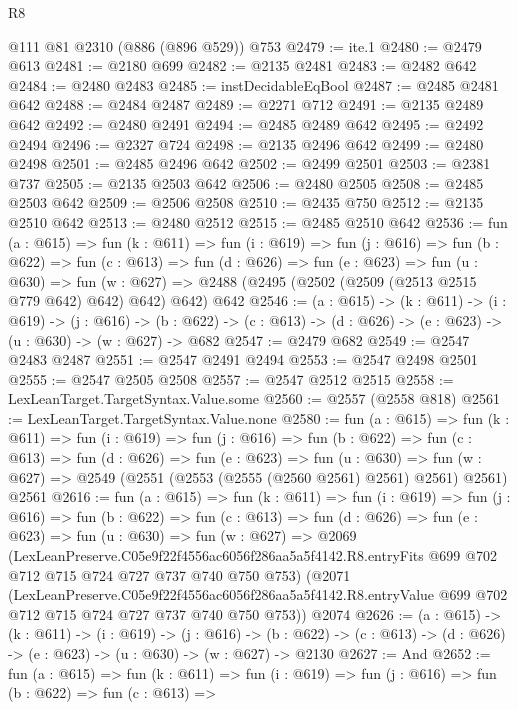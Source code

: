 \begin{lexlean}{R8}
\begin{coremodule}
    @111
    @81
    @2310
    (@886 (@896 @529))
    @753
@2479 := ite.{1}
@2480 := @2479 @613
@2481 := @2180 @699
@2482 := @2135 @2481
@2483 := @2482 @642
@2484 := @2480 @2483
@2485 := instDecidableEqBool
@2487 := @2485 @2481 @642
@2488 := @2484 @2487
@2489 := @2271 @712
@2491 := @2135 @2489 @642
@2492 := @2480 @2491
@2494 := @2485 @2489 @642
@2495 := @2492 @2494
@2496 := @2327 @724
@2498 := @2135 @2496 @642
@2499 := @2480 @2498
@2501 := @2485 @2496 @642
@2502 := @2499 @2501
@2503 := @2381 @737
@2505 := @2135 @2503 @642
@2506 := @2480 @2505
@2508 := @2485 @2503 @642
@2509 := @2506 @2508
@2510 := @2435 @750
@2512 := @2135 @2510 @642
@2513 := @2480 @2512
@2515 := @2485 @2510 @642
@2536 := fun (a : @615) =>
  fun (k : @611) =>
  fun (i : @619) =>
  fun (j : @616) =>
  fun (b : @622) =>
  fun (c : @613) =>
  fun (d : @626) =>
  fun (e : @623) =>
  fun (u : @630) =>
  fun (w : @627) => @2488 (@2495 (@2502 (@2509 (@2513 @2515 @779 @642) @642) @642) @642) @642
@2546 := (a : @615) ->
  (k : @611) ->
  (i : @619) ->
  (j : @616) ->
  (b : @622) -> (c : @613) -> (d : @626) -> (e : @623) -> (u : @630) -> (w : @627) -> @682
@2547 := @2479 @682
@2549 := @2547 @2483 @2487
@2551 := @2547 @2491 @2494
@2553 := @2547 @2498 @2501
@2555 := @2547 @2505 @2508
@2557 := @2547 @2512 @2515
@2558 := LexLeanTarget.TargetSyntax.Value.some
@2560 := @2557 (@2558 @818)
@2561 := LexLeanTarget.TargetSyntax.Value.none
@2580 := fun (a : @615) =>
  fun (k : @611) =>
  fun (i : @619) =>
  fun (j : @616) =>
  fun (b : @622) =>
  fun (c : @613) =>
  fun (d : @626) =>
  fun (e : @623) =>
  fun (u : @630) =>
  fun (w : @627) => @2549 (@2551 (@2553 (@2555 (@2560 @2561) @2561) @2561) @2561) @2561
@2616 := fun (a : @615) =>
  fun (k : @611) =>
  fun (i : @619) =>
  fun (j : @616) =>
  fun (b : @622) =>
  fun (c : @613) =>
  fun (d : @626) =>
  fun (e : @623) =>
  fun (u : @630) =>
  fun (w : @627) =>
  @2069
    (LexLeanPreserve.C05e9f22f4556ac6056f286aa5a5f4142.R8.entryFits
      @699
      @702
      @712
      @715
      @724
      @727
      @737
      @740
      @750
      @753)
    (@2071
      (LexLeanPreserve.C05e9f22f4556ac6056f286aa5a5f4142.R8.entryValue
        @699
        @702
        @712
        @715
        @724
        @727
        @737
        @740
        @750
        @753))
    @2074
@2626 := (a : @615) ->
  (k : @611) ->
  (i : @619) ->
  (j : @616) ->
  (b : @622) -> (c : @613) -> (d : @626) -> (e : @623) -> (u : @630) -> (w : @627) -> @2130
@2627 := And
@2652 := fun (a : @615) =>
  fun (k : @611) =>
  fun (i : @619) =>
  fun (j : @616) =>
  fun (b : @622) =>
  fun (c : @613) =>

\end{coremodule}
\end{lexlean}
